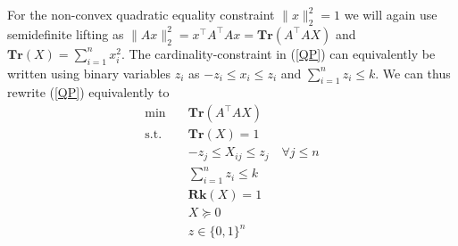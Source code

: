\documentclass[a4paper,11pt,1p]{elsarticle}
\newcommand{\T}{^{\top}}
\begin{document}
For the non-convex quadratic equality constraint $\|x\|_2^2 = 1$ we will
again use semidefinite lifting as $\|Ax\|_2^2 = x\T A\T Ax =
\textbf{Tr}(A\T A X)$ and $\textbf{Tr}(X) = \sum_{i=1}^n x_i^2$. 
The cardinality-constraint in (\ref{QP}) can equivalently be written using binary variables $z_i$ as $-z_i \leq x_i \leq z_i$ and $\sum_{i=1}^n z_i \leq k$. We can thus rewrite (\ref{QP}) equivalently to
% 
% 
\begin{align}\label{Rk1MISDP}
 \text{min} \quad & \textbf{Tr}(A\T A X) \nonumber \\
 \text{s.t.} \quad & \textbf{Tr}(X) = 1 \nonumber \\
 & -z_j \leq X_{ij} \leq z_j \quad \forall j \leq n \nonumber \\
 & \sum_{i=1}^n z_i \leq k \tag{Rk1MISDP} \\
 & \textbf{Rk}(X) = 1 \nonumber \\
 & X \succeq 0  \nonumber \\
 & z \in \{0,1\}^n \nonumber
\end{align}
\end{document}
